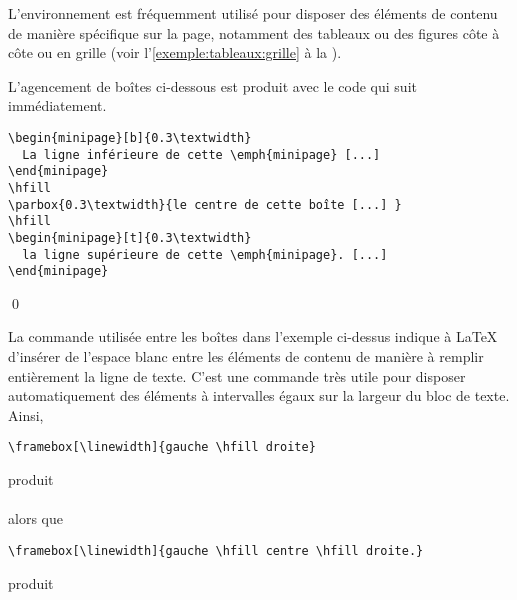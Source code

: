 L'environnement  est fréquemment utilisé pour disposer
des éléments de contenu de manière spécifique sur la page, notamment
des tableaux ou des figures côte à côte ou en grille (voir
l'\autoref{exemple:tableaux:grille} à la
).

\begin{exemple}
  L'agencement de boîtes ci-dessous est produit avec le code qui suit
  immédiatement.  \\[0.5\baselineskip]
  \begin{minipage}{\textwidth}
    \makebox[0pt][l]{\color{lightgray}\rule{\textwidth}{0.7pt}}\relax
     \hfill {}
    \hfill {}
  \end{minipage}
\begin{lstlisting}
\begin{minipage}[b]{0.3\textwidth}
  La ligne inférieure de cette \emph{minipage} [...]
\end{minipage}
\hfill
\parbox{0.3\textwidth}{le centre de cette boîte [...] }
\hfill
\begin{minipage}[t]{0.3\textwidth}
  la ligne supérieure de cette \emph{minipage}. [...]
\end{minipage}
\end{lstlisting}
  \qed
\end{exemple}

La commande \cmd{\hfill} utilisée entre les boîtes dans l'exemple ci-dessus
indique à {\LaTeX} d'insérer de l'espace blanc entre les éléments de
contenu de manière à remplir entièrement la ligne de texte. C'est une
commande très utile pour disposer automatiquement des éléments à
intervalles égaux sur la largeur du bloc de texte. Ainsi,
\begin{lstlisting}
\framebox[\linewidth]{gauche \hfill droite}
\end{lstlisting}
produit \\[0.5\baselineskip]
 \\[0.5\baselineskip]
alors que
\begin{lstlisting}
\framebox[\linewidth]{gauche \hfill centre \hfill droite.}
\end{lstlisting}
produit \\[0.5\baselineskip]



